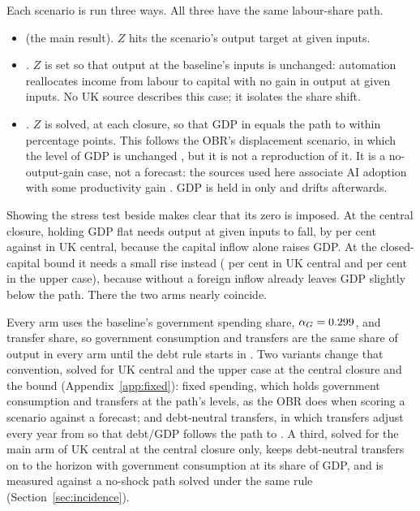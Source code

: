 Each scenario is run three ways. All three have the same labour-share path.
\begin{itemize}
\item \emph{\Main{}} (the main result). $Z$ hits the scenario's output target at given inputs.
\item \emph{\Flat{}.} $Z$ is set so that output at the baseline's \genRampZeroYear{} inputs is unchanged: automation reallocates income from labour to capital with no gain in output at given inputs. No UK source describes this case; it isolates the share shift.
\item \emph{\Stress{}.} $Z$ is solved, at each closure, so that GDP in \genHeadYear{} equals the path to within \genRFourTolPp{} percentage points. This follows the OBR's displacement scenario, in which the level of GDP is unchanged \citep[Box~2.2]{obr2026efo}, but it is not a reproduction of it. It is a no-output-gain case, not a forecast: the sources used here associate AI adoption with some productivity gain \citep{acemoglu2025,imf2026sip}. GDP is held in \genHeadYear{} only and drifts afterwards.
\end{itemize}
Showing the stress test beside \Flat{} makes clear that its zero is imposed. At the central closure, holding GDP flat needs output at given inputs to fall, by \genUkCentralStressZVsFlatCentralAbs{} per cent against \Flat{} in UK central, because the capital inflow alone raises GDP. At the closed-capital bound it needs a small rise instead (\genUkCentralStressZVsFlatBoundAbs{} per cent in UK central and \genKorinekStressZVsFlatBoundAbs{} per cent in the upper case), because without a foreign inflow \Flat{} already leaves GDP slightly below the path. There the two arms nearly coincide.

Every arm uses the baseline's government spending share, $\alpha_G = 0.299{}$, and transfer share, so government consumption and transfers are the same share of output in every arm until the debt rule starts in \genDebtRuleYear{}. Two variants change that convention, solved for UK central and the upper case at the central closure and the bound (Appendix~\ref{app:fixed}): fixed spending, which holds government consumption and transfers at the path's levels, as the OBR does when scoring a scenario against a forecast; and debt-neutral transfers, in which transfers adjust every year from \genShockYear{} so that debt/GDP follows the path to \genDebtRuleYear{}. A third, solved for the main arm of UK central at the central closure only, keeps debt-neutral transfers on to the horizon with government consumption at its share of GDP, and is measured against a no-shock path solved under the same rule (Section~\ref{sec:incidence}).

